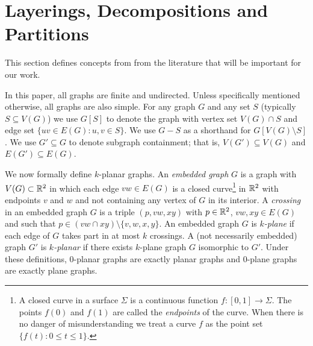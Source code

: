 \documentclass{patmorin}
\newcommand{\note}[2]{{\color{red}[#1:~#2]}}
\renewcommand{\le}{\leqslant}
\begin{document}




\section{Layerings, Decompositions and Partitions}
\label{Tools}

This section defines concepts from from the literature that will be important for our work. 

In this paper, all graphs are finite and undirected. Unless specifically mentioned otherwise, all graphs are also simple. For any graph $G$ and any set $S$ (typically $S\subseteq V(G)$) we use $G[S]$ to denote the graph with vertex set $V(G)\cap S$ and edge set $\{uv\in E(G) : u,v\in S\}$.  We use $G-S$ as a shorthand for $G[V(G)\setminus S]$. We use $G'\subseteq G$ to denote subgraph containment; that is, $V(G')\subseteq V(G)$ and $E(G')\subseteq E(G)$.

We now formally define $k$-planar graphs.  An \emph{embedded graph} $G$ is a graph with $V(G)\subset\mathbb{R}^2$ in which each edge $vw\in E(G)$ is a closed curve\footnote{A closed curve in a surface $\Sigma$ is a continuous function $f:[0,1]\to \Sigma$. The points $f(0)$ and $f(1)$ are called the \emph{endpoints} of the curve.  When there is no danger of misunderstanding we treat a curve $f$ as the point set $\{f(t):0\le t\le 1\}$.} in $\mathbb{R}^2$ with endpoints $v$ and $w$ and not containing any vertex of $G$ in its interior.  A \emph{crossing} in an embedded graph $G$ is a triple $(p,vw,xy)$ with $p\in\mathbb{R}^2$, $vw,xy\in E(G)$ and such that $p\in (vw\cap xy)\setminus\{v,w,x,y\}$. An embedded graph $G$ is \emph{$k$-plane} if each edge of $G$ takes part in at most $k$ crossings.  A (not necessarily embedded) graph $G'$ is \emph{$k$-planar} if there exists $k$-plane graph $G$ isomorphic to $G'$.  Under these definitions, $0$-planar graphs are exactly planar graphs and $0$-plane graphs are exactly plane graphs. 
\end{document}
